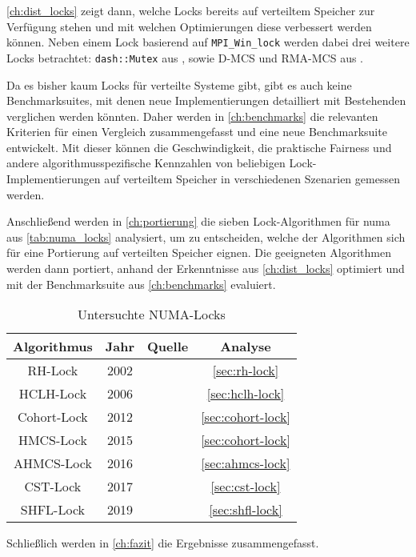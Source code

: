 \autoref{ch:dist_locks} zeigt dann,
welche Locks bereits auf verteiltem Speicher zur Verfügung stehen
und mit welchen Optimierungen diese verbessert werden können.
Neben einem Lock basierend auf \texttt{MPI\_Win\_lock}
werden dabei drei weitere Locks betrachtet:
\texttt{dash::Mutex} aus \cite{DART-MPI},
sowie D-MCS und RMA-MCS aus \cite{RMA-RW}.

Da es bisher kaum Locks für verteilte Systeme gibt,
gibt es auch keine Benchmarksuites,
mit denen neue Implementierungen detailliert mit Bestehenden verglichen werden könnten.
Daher werden in \autoref{ch:benchmarks} die relevanten Kriterien
für einen Vergleich zusammengefasst
und eine neue Benchmarksuite entwickelt.
Mit dieser können
die Geschwindigkeit,
die praktische Fairness
und andere algorithmusspezifische Kennzahlen
von beliebigen Lock-Implementierungen auf verteiltem Speicher
in verschiedenen Szenarien gemessen werden.

Anschließend werden in \autoref{ch:portierung}
die sieben Lock-Algorithmen für \gls{numa} aus \autoref{tab:numa_locks} analysiert,
um zu entscheiden,
welche der Algorithmen sich für eine Portierung auf verteilten Speicher eignen.
Die geeigneten Algorithmen werden dann portiert,
anhand der Erkenntnisse aus \autoref{ch:dist_locks} optimiert
und mit der Benchmarksuite aus \autoref{ch:benchmarks} evaluiert.

\begin{table}[h]
    \centering
    \begin{tabular}{|c|c|c|c|}
        \hline
        Algorithmus & Jahr & Quelle             & Analyse                   \\
        \hline
        RH-Lock     & 2002 & \cite{RH-Lock}     & \autoref{sec:rh-lock}     \\
        \hline
        HCLH-Lock   & 2006 & \cite{HCLH-Lock}   & \autoref{sec:hclh-lock}   \\
        \hline
        Cohort-Lock & 2012 & \cite{Cohort-Lock} & \autoref{sec:cohort-lock} \\
        \hline
        HMCS-Lock   & 2015 & \cite{HMCS-Lock}   & \autoref{sec:cohort-lock} \\
        \hline
        AHMCS-Lock  & 2016 & \cite{AHMCS-Lock}  & \autoref{sec:ahmcs-lock}  \\
        \hline
        CST-Lock    & 2017 & \cite{CST-Lock}    & \autoref{sec:cst-lock}    \\
        \hline
        SHFL-Lock   & 2019 & \cite{Shfl-Lock}   & \autoref{sec:shfl-lock}   \\
        \hline
    \end{tabular}
    \caption{Untersuchte NUMA-Locks}
    \label{tab:numa_locks}
\end{table}

Schließlich werden in \autoref{ch:fazit} die Ergebnisse zusammengefasst.

